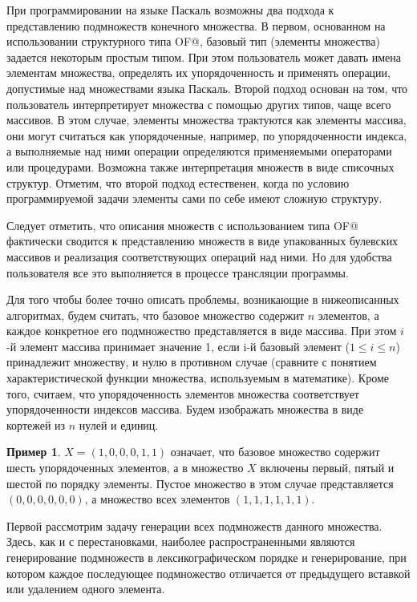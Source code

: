 \documentclass[12pt,a4paper]{article}
\theoremstyle{plain}
\theoremstyle{definition}
\newtheorem*{example}{Пример}
\theoremstyle{remark}
\begin{document}
При программировании на языке Паскаль возможны два подхода к представлению подмножеств конечного множества. В первом, основанном на использовании структурного типа \verb@SET OF@, базовый тип (элементы множества) задается некоторым простым типом. При этом пользователь может давать имена элементам множества, определять их упорядоченность и применять операции, допустимые над множествами языка Паскаль. Второй подход основан на том, что пользователь интерпретирует множества с помощью других типов, чаще всего массивов. В этом случае, элементы множества трактуются как элементы массива, они могут считаться как упорядоченные, например, по упорядоченности индекса, а выполняемые над ними операции определяются применяемыми операторами или процедурами. Возможна также интерпретация множеств в виде списочных структур. Отметим, что второй подход естественен, когда по условию программируемой задачи элементы сами по себе имеют сложную структуру.

Следует отметить, что описания множеств с использованием типа \verb@SET OF@ фактически сводится к представлению множеств в виде упакованных булевских массивов и реализация соответствующих операций над ними. Но для удобства пользователя все это выполняется в процессе трансляции программы.

Для того чтобы более точно описать проблемы, возникающие в нижеописанных алгоритмах, будем считать, что базовое множество содержит $n$ элементов, а каждое конкретное его подмножество представляется в виде массива. При этом $i$-й элемент массива принимает значение 1, если i-й базовый элемент ($1\le i\le n$) принадлежит множеству, и нулю в противном случае (сравните с понятием характеристической функции множества, используемым в математике). Кроме того, считаем, что упорядоченность элементов множества соответствует упорядоченности индексов массива. Будем изображать множества в виде кортежей из $n$ нулей и единиц. 

\begin{example}
$X=(1,0,0,0,1,1)$ означает, что базовое множество содержит шесть упорядоченных элементов, а в множество $X$ включены первый, пятый и шестой по порядку элементы. Пустое множество в этом случае представляется $(0,0,0,0,0,0)$, а множество всех элементов $(1,1,1,1,1,1)$.
\end{example}

Первой рассмотрим задачу генерации всех подмножеств данного множества. Здесь, как и с перестановками, наиболее распространенными являются генерирование подмножеств в лексикографическом порядке и генерирование, при котором каждое последующее подмножество отличается от предыдущего вставкой или удалением одного элемента.
\end{document}
